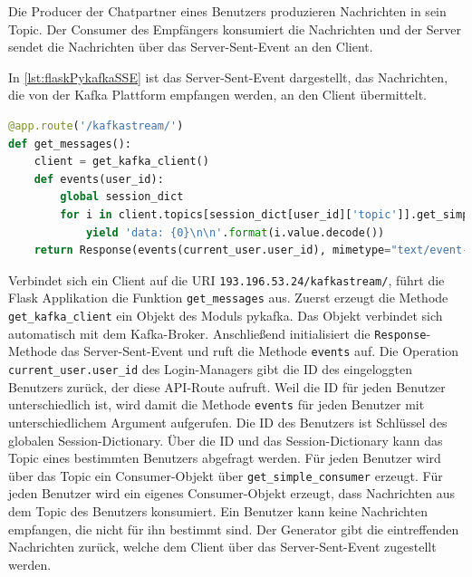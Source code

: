 \documentclass[a4paper,titlepage,halfparskip,12pt]{scrreprt}
\begin{document}
\begin{onehalfspacing}
Die Producer der Chatpartner eines Benutzers produzieren Nachrichten in sein Topic. Der Consumer des Empfängers konsumiert die Nachrichten und der Server sendet die Nachrichten über das Server-Sent-Event an den Client.

In \autoref{lst:flaskPykafkaSSE} ist das Server-Sent-Event dargestellt, das Nachrichten, die von der Kafka Plattform empfangen werden, an den Client übermittelt.

\begin{lstlisting}[language=python, caption={Code des Server-Sent-Events für den Empfang von Nachrichten der Kafka Plattform}, label={lst:flaskPykafkaSSE}]
@app.route('/kafkastream/')
def get_messages():
    client = get_kafka_client()
    def events(user_id):
        global session_dict
        for i in client.topics[session_dict[user_id]['topic']].get_simple_consumer():
            yield 'data: {0}\n\n'.format(i.value.decode())
    return Response(events(current_user.user_id), mimetype="text/event-stream")
\end{lstlisting}

Verbindet sich ein Client auf die \acs{URI} \texttt{193.196.53.24/kafkastream/}, führt die Flask Applikation die Funktion \texttt{get\_messages} aus. Zuerst erzeugt die Methode \texttt{get\_kafka\_client} ein Objekt des Moduls pykafka. Das Objekt verbindet sich automatisch mit dem Kafka-Broker. Anschließend initialisiert die \texttt{Response}-Methode das Server-Sent-Event und ruft die Methode \texttt{events} auf.
Die Operation \texttt{current\_user.user\_id} des Login-Managers gibt die ID des eingeloggten Benutzers zurück, der diese \acs{API}-Route aufruft. Weil die ID für jeden Benutzer unterschiedlich ist, wird damit die Methode \texttt{events} für jeden Benutzer mit unterschiedlichem Argument aufgerufen. Die ID des Benutzers ist Schlüssel des globalen Session-Dictionary. Über die ID und das Session-Dictionary kann das Topic eines bestimmten Benutzers abgefragt werden. Für jeden Benutzer wird über das Topic ein Consumer-Objekt über \texttt{get\_simple\_consumer} erzeugt. Für jeden Benutzer wird ein eigenes Consumer-Objekt erzeugt, dass Nachrichten aus dem Topic des Benutzers konsumiert. Ein Benutzer kann keine Nachrichten empfangen, die nicht für ihn bestimmt sind. Der Generator gibt die eintreffenden Nachrichten zurück, welche dem Client über das Server-Sent-Event zugestellt werden.


\end{onehalfspacing}
\end{document}
